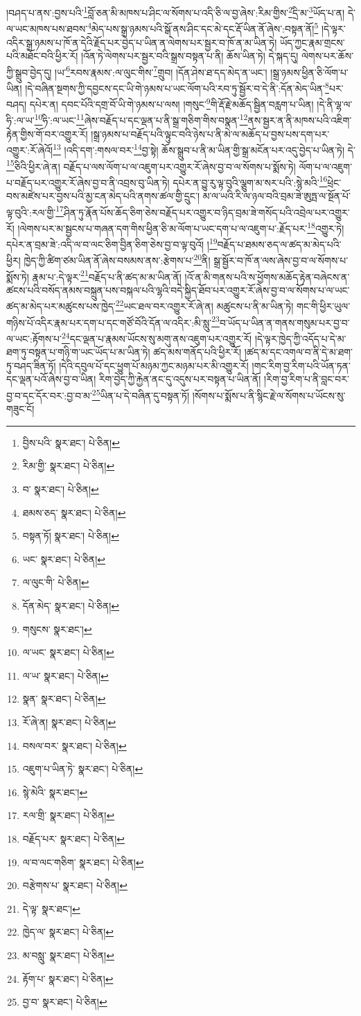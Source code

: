 །བཤད་པ་ནས་:བྱས་པའི་\footnote{བྱིས་པའི་  སྣར་ཐང་།  པེ་ཅིན། }བློ་ཅན་མི་མཁས་པ་ཤིང་ལ་སོགས་པ་འདི་ཅི་ལ་བྱ་ཞེས་:རིམ་གྱིས་\footnote{རིམ་གྱི་  སྣར་ཐང་།  པེ་ཅིན། }དྲི་མ་\footnote{བ་  སྣར་ཐང་།  པེ་ཅིན། }ཡོད་པ་ན། དེ་ལ་ཡང་མཁས་པས་ཐབས་\footnote{ཐམས་ཅད་  སྣར་ཐང་།  པེ་ཅིན། }མེད་པས་སྒྲ་ཉམས་པའི་སྒོ་ནས་ཤིང་དང་མེ་དང་རྡོ་ཡིན་ནོ་ཞེས་:བསྟན་ནོ།\footnote{བསྟན་ཏོ།  སྣར་ཐང་།  པེ་ཅིན། } །དེ་ལྟར་འདིར་སྒྲ་ཉམས་པ་ཁོ་ན་དེའི་རྗོད་པར་བྱེད་པ་ཡིན་ན་ལེགས་པར་སྦྱར་བ་ཁོ་ན་མ་ཡིན་ཏེ། ཡོད་ཀྱང་རྣམ་གྲངས་པའི་མཐོང་བའི་ཕྱིར་རོ། །འོན་ཏེ་ལེགས་པར་སྦྱར་བའི་སྒྲས་བསྟན་པ་ནི། ཆོས་ཡིན་ཏེ། དེ་སྐད་དུ། ལེགས་པར་ཆོས་ཀྱི་སྒྲུབ་བྱེད་དུ། །ཡ་\footnote{ཡང་  སྣར་ཐང་།  པེ་ཅིན། }རབས་རྣམས་:ལ་ལུང་གིས་\footnote{ལ་ལུང་གི་  པེ་ཅིན། }གྲུབ། །དོན་ཤེས་ཐ་དད་མེད་ན་ཡང་། །སྒྲ་ཉམས་ཕྱིན་ཅི་ལོག་པ་ཡིན། །དེ་བཞིན་སྔགས་ཀྱི་དབྱངས་དང་ཡི་གེ་ཉམས་པ་ཡང་ལོག་པའི་རབ་ཏུ་སྦྱོར་བ་དེ་ནི་:དོན་མེད་ཡིན་\footnote{དོན་མེད་  སྣར་ཐང་།  པེ་ཅིན། }པར་བཤད། དཔེར་ན། དབང་པོའི་དགྲ་བོ་ཡི་གེ་ཉམས་པ་ལས། །གསུང་\footnote{གསུངས་  སྣར་ཐང་། }གི་རྡོ་རྗེ་མཆོད་སྦྱིན་བརླག་པ་ཡིན། །དེ་ནི་ལྷ་ལ་ཧི་:ལ་ཡ་\footnote{ལ་ཡང་  སྣར་ཐང་།  པེ་ཅིན། }ཧི་:ལ་ཡང་\footnote{ལ་ཡ་  སྣར་ཐང་།  པེ་ཅིན། }ཞེས་བརྗོད་པ་དང་ལྡན་པ་ནི་སྒྲ་གཅིག་གིས་བསྣན་\footnote{སྣན་  སྣར་ཐང་།  པེ་ཅིན། }ནས་སྦྱར་ན་ནི་མཁས་པའི་འཇིག་རྟེན་གྱིས་གོ་བར་འགྱུར་རོ། །སྒྲ་ཉམས་པ་བརྗོད་པའི་ལྟུང་བའི་ཉེས་པ་ནི་མེ་ལ་མཆོད་པ་བྱས་པས་དག་པར་འགྱུར་:རོ་ཞེའོ།\footnote{རོ་ཞེ་ན།  སྣར་ཐང་།  པེ་ཅིན། } །འདི་དག་:གསལ་བར་\footnote{བསལ་བར་  སྣར་ཐང་།  པེ་ཅིན། }བྱ་སྟེ། ཆོས་སྒྲུབ་པ་ནི་མ་ཡིན་གྱི་སྒྲ་མངོན་པར་འདུ་བྱེད་པ་ཡིན་ཏེ། དེ་\footnote{འཇུག་པ་ཡིན་ཏེ་  སྣར་ཐང་།  པེ་ཅིན། }ཅིའི་ཕྱིར་ཞེ་ན། བརྗོད་པ་ལས་ལོག་པ་ལ་འཇུག་པར་འགྱུར་རོ་ཞེས་བྱ་བ་ལ་སོགས་པ་སྨོས་ཏེ། ལོག་པ་ལ་འཇུག་པ་བརྗོད་པར་འགྱུར་རོ་ཞེས་བྱ་བ་ནི་འབྲས་བུ་ཡིན་ཏེ། དཔེར་ན་བྱུ་རུ་ལྟ་བུའི་ལྕུག་མ་སར་པའི་:སྙེ་མའི་\footnote{སྙེ་མེའི་  སྣར་ཐང་། }ཕྲེང་བས་མཛེས་པར་བྱས་པའི་མྱ་ངན་མེད་པའི་ནགས་ཚལ་གྱི་དྲུང་། མ་ལ་ཡའི་རི་ལ་ཉལ་བའི་བྲམ་ཟེ་ཨུཏྤ་ལ་སྔོན་པོ་ལྟ་བུའི་:རལ་གྱི་\footnote{རལ་གྲི་  སྣར་ཐང་།  པེ་ཅིན། }ཤིན་ཏུ་རྣོན་པོས་ཆོད་ཅིག་ཅེས་བརྗོད་པར་འགྱུར་བ་ཉིད་བྲམ་ཟེ་གསོད་པའི་འབྲེལ་པར་འགྱུར་རོ། །ལེགས་པར་མ་སྦྱངས་པ་གཞན་དག་གིས་ཕྱིན་ཅི་མ་ལོག་པ་ཡང་དག་པ་ལ་འཇུག་པ་:རྗོད་པར་\footnote{བརྗོད་པར་  སྣར་ཐང་།  པེ་ཅིན། }འགྱུར་ཏེ། དཔེར་ན་བྲམ་ཟེ་:འདི་ལ་བ་ལང་ཅིག་བྱིན་ཅིག་ཅེས་བྱ་བ་ལྟ་བུའོ། །\footnote{ལ་བ་ལང་གཅིག་  སྣར་ཐང་།  པེ་ཅིན། }བརྗོད་པ་ཐམས་ཅད་ལ་ཚད་མ་མེད་པའི་ཕྱིར། ཁྱེད་ཀྱི་ཚིག་ཙམ་ཡིན་ནོ་ཞེས་བསམས་ནས་:རྩེགས་པ་\footnote{བརྩེགས་པ་  སྣར་ཐང་།  པེ་ཅིན། }ནི། སྒྲ་སྦྱོར་བ་ཁོ་ན་ལས་ཞེས་བྱ་བ་ལ་སོགས་པ་སྨོས་ཏེ། རྣམ་པ་:དེ་ལྟར་\footnote{དེ་ལྟ་  སྣར་ཐང་། }བརྗོད་པ་ནི་ཚད་མ་མ་ཡིན་ནོ། །འོ་ན་མི་གནས་པའི་ས་ཕྱོགས་མཆོད་རྟེན་བཞེངས་ན་ཚངས་པའི་བསོད་ནམས་བསྐྲུན་པས་བསྐལ་པའི་ལྷའི་བདེ་སྐྱིད་ཐོབ་པར་འགྱུར་རོ་ཞེས་བྱ་བ་ལ་སོགས་པ་ལ་ཡང་ཚད་མ་མེད་པར་མཚུངས་པས་ཁྱེད་\footnote{ཁྱེད་ལ་  སྣར་ཐང་།  པེ་ཅིན། }ཡང་ཐལ་བར་འགྱུར་རོ་ཞེ་ན། མཚུངས་པ་ནི་མ་ཡིན་ཏེ། གང་གི་ཕྱིར་ཡུལ་གཉིས་པོ་འདིར་རྣམ་པར་དག་པ་དང་གཙོ་བོའི་དོན་ལ་འདིར་:མི་སླུ་\footnote{མ་བསླུ་  སྣར་ཐང་།  པེ་ཅིན། }བ་ཡོད་པ་ཡིན་ན་གནས་གསུམ་པར་བྱ་བ་ལ་ཡང་:རྟོགས་པ་\footnote{རྟོག་པ་  སྣར་ཐང་།  པེ་ཅིན། }དང་ལྡན་པ་རྣམས་ཡོངས་སུ་མགུ་ནས་འཇུག་པར་འགྱུར་རོ། །དེ་ལྟར་ཁྱེད་ཀྱི་འདོད་པ་དེ་མ་ཐག་ཏུ་བསྟན་པ་གཉི་ག་ཡང་ཡོད་པ་མ་ཡིན་ཏེ། ཚད་མས་གནོད་པའི་ཕྱིར་རོ། །ཚད་མ་དང་འགལ་བ་ནི་དེ་མ་ཐག་ཏུ་བཤད་ཟིན་ཏོ། །དེའི་དབུལ་པོ་དང་ཕྱུག་པོ་མཉམ་ཀྱང་མཉམ་པར་མི་འགྱུར་རོ། །གང་རིག་བྱ་རིག་པའི་ཡོན་ཏན་དང་ལྡན་པའོ་ཞེས་བྱ་བ་ཡིན། རིག་བྱེད་ཀྱི་རྐྱེན་ནང་དུ་འདུས་པར་བསྟན་པ་ཡིན་ནོ། །རིག་བྱ་རིག་པ་ནི་བླང་བར་བྱ་བ་དང་དོར་བར་:བྱ་བ་མ་\footnote{བྱ་བ་  སྣར་ཐང་།  པེ་ཅིན། }ཡིན་པ་དེ་བཞིན་དུ་བསྟན་ཏོ། །སོགས་པ་སྨོས་པ་ནི་སྙིང་རྗེ་ལ་སོགས་པ་ཡོངས་སུ་གཟུང་ངོ། 